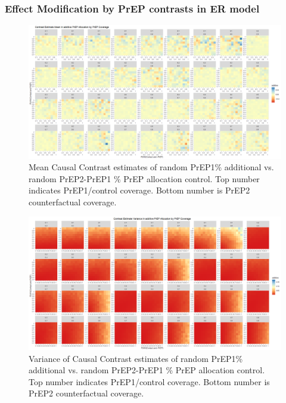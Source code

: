 \documentclass{article}
\theoremstyle{definition}
\begin{document}
\subsubsection{Effect Modification by PrEP contrasts in ER model}
\begin{figure}[H]
    \centering
    \includegraphics[scale=0.35]{Figures/PrEP Additive Mean Plots.png}
    \caption{Mean Causal Contrast estimates of random PrEP1\% additional vs. random PrEP2-PrEP1 \% PrEP allocation control. Top number indicates PrEP1/control coverage. Bottom number is PrEP2 counterfactual coverage. }
    \label{fig:Figure 17}
\end{figure}
\begin{figure}[H]
    \centering
    \includegraphics[scale=0.35]{Figures/PrEP Additive Variance Plots.png}
    \caption{Variance of Causal Contrast estimates of random PrEP1\% additional vs. random PrEP2-PrEP1 \% PrEP allocation control. Top number indicates PrEP1/control coverage. Bottom number is PrEP2 counterfactual coverage.}
    \label{fig:Figure 18}
\end{figure}
\end{document}
